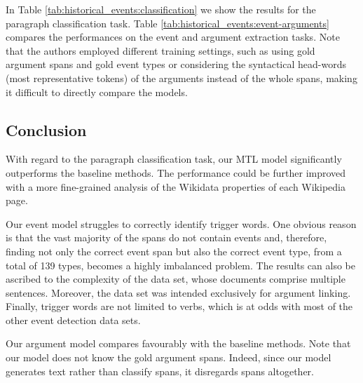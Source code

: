 \documentclass[runningheads]{llncs}
\begin{document}
In Table \ref{tab:historical_events:classification} we show the results for the paragraph classification task. Table \ref{tab:historical_events:event-arguments} compares the performances on the event and argument extraction tasks. Note that the authors employed different training settings, such as using gold argument spans and gold event types or considering the syntactical head-words (most representative tokens) of the arguments instead of the whole spans, making it difficult to directly compare the models.

\subsection{Conclusion}

With regard to the paragraph classification task, our MTL model significantly outperforms the baseline methods. The performance could be further improved with a more fine-grained analysis of the Wikidata properties of each Wikipedia page.

Our event model struggles to correctly identify trigger words. One obvious reason is that the vast majority of the spans do not contain events and, therefore, finding not only the correct event span but also the correct event type, from a total of 139 types, becomes a highly imbalanced problem. The results can also be ascribed to the complexity of the data set, whose documents comprise multiple sentences. Moreover, the data set was intended exclusively for argument linking. Finally, trigger words are not limited to verbs, which is at odds with most of the other event detection data sets.

Our argument model compares favourably with the baseline methods. Note that our model does not know the gold argument spans. Indeed, since our model generates text rather than classify spans, it disregards spans altogether.



\end{document}
